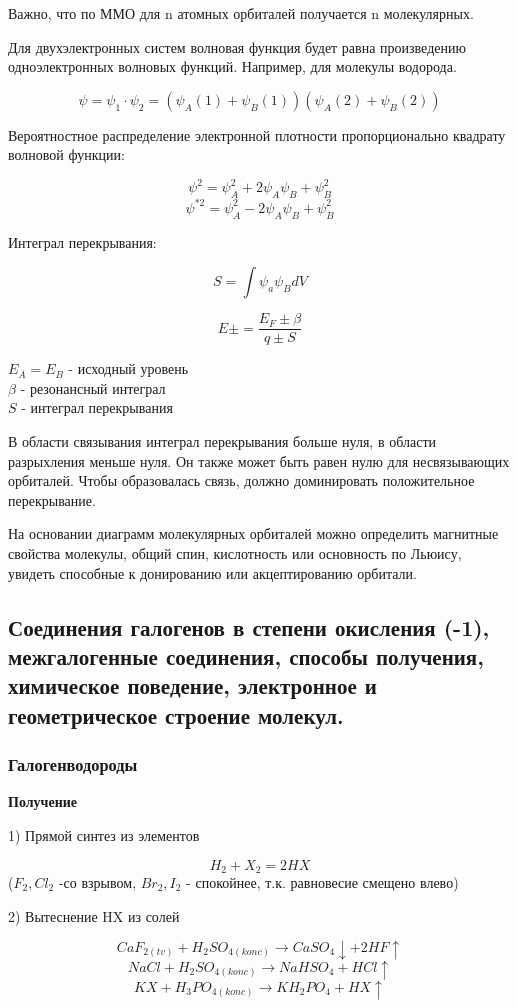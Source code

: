 \documentclass[14pt,a4paper]{scrartcl}
\begin{document}
Важно, что по ММО для n атомных орбиталей получается n
молекулярных.

Для двухэлектронных систем волновая функция будет равна
произведению одноэлектронных волновых функций. Например,
для молекулы водорода.

$$\psi = \psi_1\cdot\psi_2 = (\psi_A(1)+\psi_B(1))(\psi_A(2)+\psi_B(2))$$

Вероятностное распределение электронной плотности пропорционально квадрату волновой функции:

$$\psi^2 = \psi_A^2 + 2\psi_A\psi_B + \psi_B^2$$
$$\psi^{*2} = \psi_A^2 - 2\psi_A\psi_B + \psi_B^2$$

Интеграл перекрывания:

$$S = \int\psi_a\psi_BdV$$

$$E\pm = \frac{E_F\pm\beta}{q\pm S}$$

$E_A = E_B$ - исходный уровень\\
$\beta$ - резонансный интеграл\\
$S$ - интеграл перекрывания

В области связывания интеграл перекрывания больше нуля, в
области разрыхления меньше нуля. Он также может быть равен
нулю для несвязывающих орбиталей. Чтобы образовалась связь,
должно доминировать положительное перекрывание.

На основании диаграмм молекулярных орбиталей можно
определить магнитные свойства молекулы, общий спин,
кислотность или основность по Льюису, увидеть способные к
донированию или акцептированию орбитали.

\subsection{\textbf{Соединения галогенов в степени окисления (-1), межгалогенные соединения, способы получения, химическое поведение, электронное и геометрическое строение молекул.}}

\subsubsection{Галогенводороды}

\textbf{Получение}

1) Прямой синтез из элементов

$$H_2 + X_2 = 2HX$$
($F_2, Cl_2$ -со взрывом, $Br_2, I_2$ - спокойнее, т.к. равновесие смещено влево)

2) Вытеснение HX из солей

$$CaF_{2(tv)} + H_2SO_{4(konc)} \rightarrow CaSO_4\downarrow + 2HF\uparrow$$
$$NaCl + H_2SO_{4(konc)} \rightarrow NaHSO_4 + HCl\uparrow$$
$$KX + H_3PO_{4(konc)} \rightarrow KH_2PO_4 + HX\uparrow$$
\end{document}
